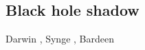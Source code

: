 \subsection{Black hole shadow}


\begin{hist}
Darwin \cite{Darwi59}, Synge \cite{Synge66}, Bardeen \cite{Barde73}
\end{hist}














